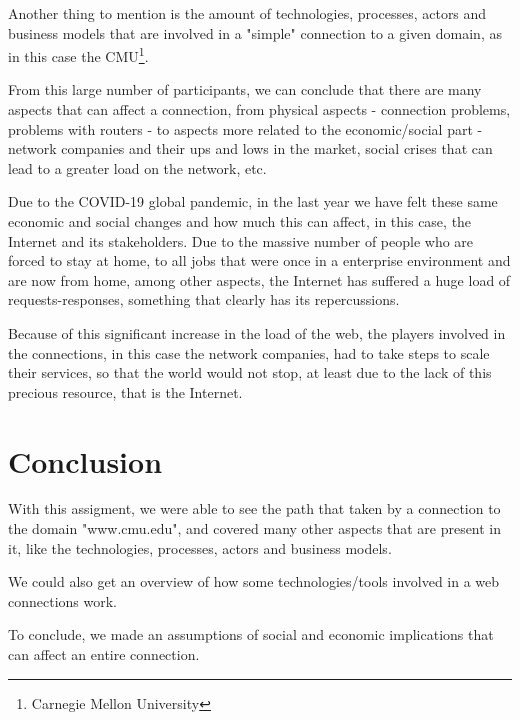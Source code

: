 \documentclass{article}
\newcommand\tab[1][1cm]{\hspace*{#1}}
\begin{document}
Another thing to mention is the amount of technologies, processes, actors and business models that are involved in a "simple" connection to a given domain, as in this case the CMU\footnote{Carnegie Mellon University}.

From this large number of participants, we can conclude that there are many aspects that can affect a connection, from physical aspects - connection problems, problems with routers - to aspects more related to the economic/social part - network companies and their ups and lows in the market, social crises that can lead to a greater load on the network, etc.

Due to the COVID-19 global pandemic, in the last year we have felt these same economic and social changes and how much this can affect, in this case, the Internet and its stakeholders. Due to the massive number of people who are forced to stay at home, to all jobs that were once in a enterprise environment and are now from home, among other aspects, the Internet has suffered a huge load of requests-responses, something that clearly has its repercussions.

Because of this significant increase in the load of the web, the players involved in the connections, in this case the network companies, had to take steps to scale their services, so that the world would not stop, at least due to the lack of this precious resource, that is the Internet.

\section{Conclusion}

\tab With this assigment, we were able to see the path that taken by a connection to the domain "www.cmu.edu", and covered many other aspects that are present in it, like the technologies, processes, actors and business models.

We could also get an overview of how some technologies/tools involved in a web connections work. 

To conclude, we made an assumptions of social and economic implications that can affect an entire connection.

\newpage

\nocite{*}
\printbibliography
\end{document}
